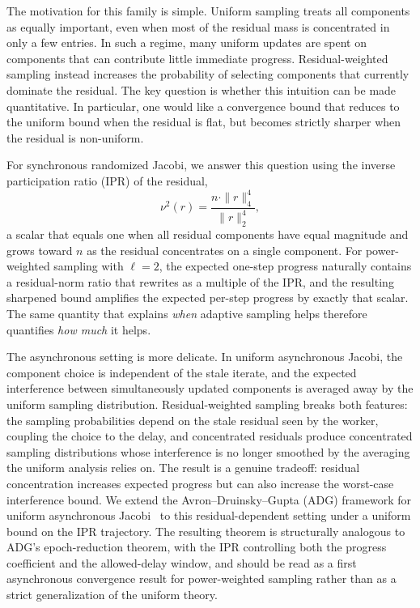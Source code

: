 \documentclass[pdflatex,sn-mathphys-num]{sn-jnl}%
\newcommand{\norm}[2]{\|#1\|_{#2}}
\theoremstyle{thmstyleone}%
\theoremstyle{thmstyletwo}%
\theoremstyle{thmstylethree}%
\begin{document}
The motivation for this family is simple.  Uniform sampling treats all
components as equally important, even when most of the residual mass is
concentrated in only a few entries.  In such a regime, many uniform updates are
spent on components that can contribute little immediate progress.  Residual-weighted sampling instead increases the probability of selecting components
that currently dominate the residual.  The key question is whether this
intuition can be made quantitative.  In particular, one would like a convergence
bound that reduces to the uniform bound when the residual is flat, but becomes
strictly sharper when the residual is non-uniform.

For synchronous randomized Jacobi, we answer this question using the
inverse participation ratio (IPR) of the residual,
\[
\nu^2(r) = \frac{n \cdot \norm{r}{4}^4}{\norm{r}{2}^4},
\]
a scalar that equals one when all residual components have equal magnitude
and grows toward $n$ as the residual concentrates on a single component.
For power-weighted sampling with $\ell = 2$, the expected one-step progress
naturally contains a residual-norm ratio that rewrites as a multiple of the
IPR, and the resulting sharpened bound amplifies the expected per-step
progress by exactly that scalar. The same quantity that explains \emph{when}
adaptive sampling helps therefore quantifies \emph{how much} it helps.

The asynchronous setting is more delicate. In uniform asynchronous Jacobi,
the component choice is independent of the stale iterate, and the expected
interference between simultaneously updated components is averaged away by
the uniform sampling distribution. Residual-weighted sampling breaks both
features: the sampling probabilities depend on the stale residual seen by
the worker, coupling the choice to the delay, and concentrated residuals
produce concentrated sampling distributions whose interference is no longer
smoothed by the averaging the uniform analysis relies on. The result is a
genuine tradeoff: residual concentration increases expected progress but
can also increase the worst-case interference bound. We extend the
Avron--Druinsky--Gupta (ADG) framework for uniform asynchronous
Jacobi~\cite{avron2015revisiting} to this residual-dependent setting under
a uniform bound on the IPR trajectory. The resulting theorem is structurally
analogous to ADG's epoch-reduction theorem, with the IPR controlling both
the progress coefficient and the allowed-delay window, and should be read
as a first asynchronous convergence result for power-weighted sampling
rather than as a strict generalization of the uniform theory.
\end{document}
